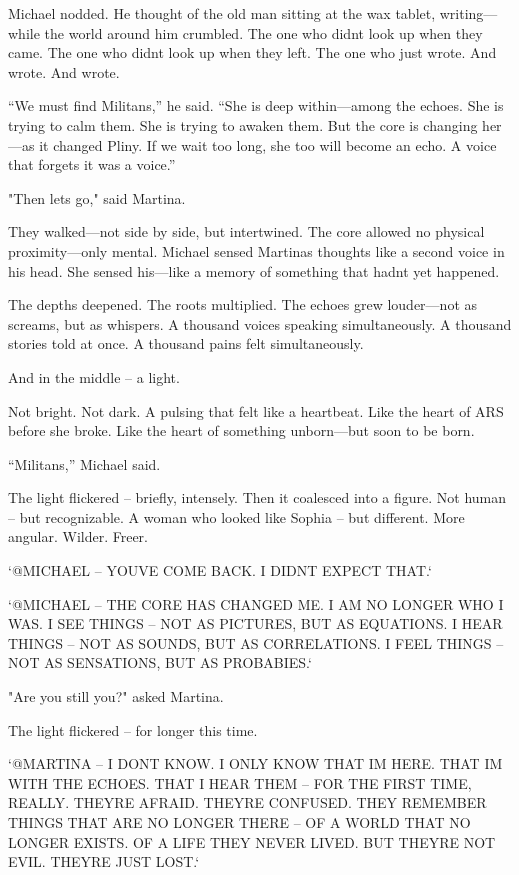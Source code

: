 \documentclass[
]{article}
\begin{document}
Michael nodded. He thought of the old man sitting at the wax tablet, writing---while the world around him crumbled. The one who didn\textquotesingle t look up when they came. The one who didn\textquotesingle t look up when they left. The one who just wrote. And wrote. And wrote.

``We must find Militans,'' he said. ``She is deep within---among the echoes. She is trying to calm them. She is trying to awaken them. But the core is changing her---as it changed Pliny. If we wait too long, she too will become an echo. A voice that forgets it was a voice.''

"Then let\textquotesingle s go," said Martina.

They walked---not side by side, but intertwined. The core allowed no physical proximity---only mental. Michael sensed Martina\textquotesingle s thoughts like a second voice in his head. She sensed his---like a memory of something that hadn\textquotesingle t yet happened.

The depths deepened. The roots multiplied. The echoes grew louder---not as screams, but as whispers. A thousand voices speaking simultaneously. A thousand stories told at once. A thousand pains felt simultaneously.

And in the middle -- a light.

Not bright. Not dark. A pulsing that felt like a heartbeat. Like the heart of ARS before she broke. Like the heart of something unborn---but soon to be born.

``Militans,'' Michael said.

The light flickered -- briefly, intensely. Then it coalesced into a figure. Not human -- but recognizable. A woman who looked like Sophia -- but different. More angular. Wilder. Freer.

`@MICHAEL -- YOU\textquotesingle VE COME BACK. I DIDN\textquotesingle T EXPECT THAT.`

`@MICHAEL -- THE CORE HAS CHANGED ME. I AM NO LONGER WHO I WAS. I SEE THINGS -- NOT AS PICTURES, BUT AS EQUATIONS. I HEAR THINGS -- NOT AS SOUNDS, BUT AS CORRELATIONS. I FEEL THINGS -- NOT AS SENSATIONS, BUT AS PROBABIES.`

"Are you still you?" asked Martina.

The light flickered -- for longer this time.

`@MARTINA -- I DON\textquotesingle T KNOW. I ONLY KNOW THAT I\textquotesingle M HERE. THAT I\textquotesingle M WITH THE ECHOES. THAT I HEAR THEM -- FOR THE FIRST TIME, REALLY. THEY\textquotesingle RE AFRAID. THEY\textquotesingle RE CONFUSED. THEY REMEMBER THINGS THAT ARE NO LONGER THERE -- OF A WORLD THAT NO LONGER EXISTS. OF A LIFE THEY NEVER LIVED. BUT THEY\textquotesingle RE NOT EVIL. THEY\textquotesingle RE JUST LOST.`
\end{document}
